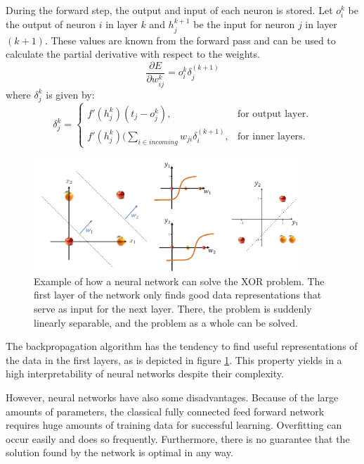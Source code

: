 \documentclass[11pt,a4paper]{article}
\begin{document}
During the forward step, the output and input of each neuron is stored. Let $o_i^k$ be the output of neuron $i$ in layer $k$ and $h_j^{k+1}$ be the input for neuron $j$ in layer $(k+1)$. These values are known from the forward pass and can be used to calculate the partial derivative with respect to the weights.
\begin{equation*}
\frac{\partial E}{\partial w_{ij}^k} = o_i^k \delta_j^{(k+1)}
\end{equation*}
where $\delta_j^k$ is given by:
\begin{equation*}
\delta_j^k = \begin{cases}
	f'(h_j^k) (t_j - o_j^k), & \text{for output layer}.\\
	f'(h_j^k)(\sum_{i \in incoming} w_{ji} \delta_i^{(k+1)}, & \text{for inner layers}.
\end{cases}
\end{equation*}
\begin{figure}[h]
\includegraphics[width=0.9\textwidth]{ann_intuition.png}
\centering
\caption[Hierarchical Learning in aNNs]{Example of how a neural network can solve the XOR problem. The first layer of the network only finds good data representations that serve as input for the next layer. There, the problem is suddenly linearly separable, and the problem as a whole can be solved.}
\label{fig:annIntuition}
\end{figure}
The backpropagation algorithm has the tendency to find useful representations of the data in the first layers, as is depicted in figure \ref{fig:annIntuition}. This property yields in a high interpretability of neural networks despite their complexity.

However, neural networks have also some disadvantages. Because of the large amounts of parameters, the classical fully connected feed forward network requires huge amounts of training data for successful learning. Overfitting can occur easily and does so frequently. Furthermore, there is no guarantee that the solution found by the network is optimal in any way.
\end{document}
